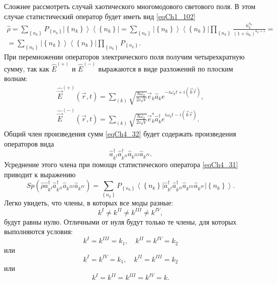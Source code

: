 Сложнее рассмотреть случай хаотического многомодового светового
поля. В этом случае статистический оператор будет иметь вид
\eqref{eqCh1_102} 
\begin{eqnarray}
\hat{\rho} = \sum_{\left\{n_k\right\}} P_{\left\{n_k\right\}} \left|\left\{n_k\right\}\right>\left<\left\{n_k\right\}\right| = 
\sum_{\left\{n_k\right\}} 
 \left|\left\{n_k\right\}\right>\left<\left\{n_k\right\}\right|
\prod_{\left\{n_k\right\}} 
\frac{\bar{n}_k^{n_k}}{\left(1 + \bar{n}_k\right)^{n_k+1}} = 
\nonumber \\
= 
\sum_{\left\{n_k\right\}} 
 \left|\left\{n_k\right\}\right>\left<\left\{n_k\right\}\right|
\prod_{\left\{n_k\right\}} P_{\left\{n_k\right\}}.
\label{eqCh4_31}
\end{eqnarray}
При перемножении операторов электрического поля получим четырехкратную
сумму, так как $\hat{E}^{(+)}$ и $\hat{E}^{(-)}$ выражаются в виде
разложений по плоским волнам: 
\begin{eqnarray}
\hat{\vec{E}}^{(+)}\left(\vec{r}, t\right) = \sum_{(k)}
\sqrt{\frac{\hbar \omega_k}{2 \varepsilon_0 V}} \vec{e}_k \hat{a}_k
e^{-i \omega_k t + i \left(\vec{k} \vec{r}\right)},
\nonumber \\
\hat{\vec{E}}^{(-)}\left(\vec{r}, t\right) = \sum_{(k)}
\sqrt{\frac{\hbar \omega_k}{2 \varepsilon_0 V}} \vec{e}_k^{*} \hat{a}_k^{\dag}
e^{i \omega_k t - i \left(\vec{k} \vec{r}\right)}.
\label{eqCh4_32}
\end{eqnarray}
Общий член произведения сумм \eqref{eqCh4_32} будет содержать
произведения операторов вида 
\begin{equation}
\hat{a}^{\dag}_{k^{I}}\hat{a}^{\dag}_{k^{II}}\hat{a}_{k^{III}}\hat{a}_{k^{IV}}.
\label{eqCh4_33}
\end{equation}
Усреднение этого члена при помощи статистического оператора
\eqref{eqCh4_31} приводит к выражению 
\[
Sp\left(\hat{\rho}
\hat{a}^{\dag}_{k^{I}}\hat{a}^{\dag}_{k^{II}}\hat{a}_{k^{III}}\hat{a}_{k^{IV}}
\right) = 
\sum_{\left\{n_k\right\}} P_{\left\{n_k\right\}}
\left<\left\{n_k\right\}\right|
\hat{a}^{\dag}_{k^{I}}\hat{a}^{\dag}_{k^{II}}\hat{a}_{k^{III}}\hat{a}_{k^{IV}}
\left|\left\{n_k\right\}\right>.
\]
Легко увидеть, что члены, в которых все моды разные: 
\[
k^{I} \neq k^{II} \neq k^{III} \neq k^{IV},
\]
будут равны нулю. Отличными от нуля будут только те члены, для которых
выполняются условия:
\[
k^{I} = k^{III} = k_1, \quad k^{II} = k^{IV} = k_2
\]
или
\[
k^{I} = k^{IV} = k_1, \quad k^{II} = k^{III} = k_2
\]
или
\[
k^{I} = k^{II} =  k^{III} = k^{IV} = k.
\]   

